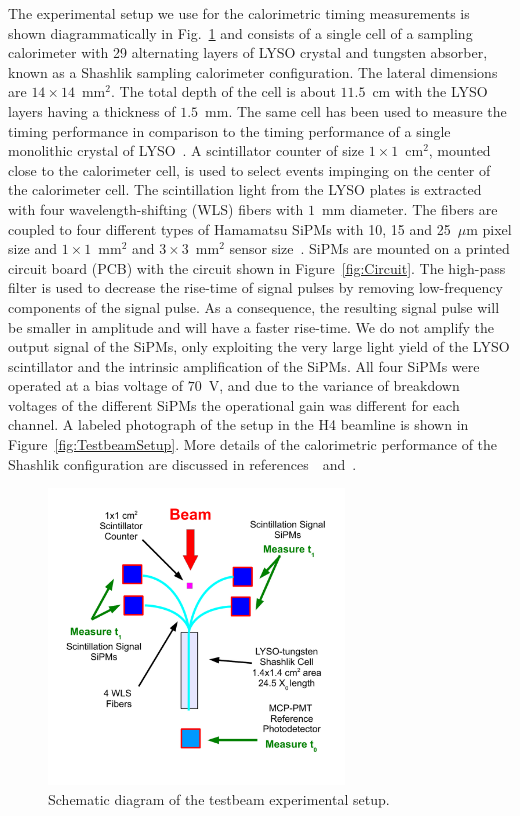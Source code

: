 The experimental setup we use for the calorimetric timing measurements 
is shown diagrammatically in Fig.~\ref{fig:TestbeamSchematic} and consists
of a single cell of a sampling calorimeter with 29 alternating layers of LYSO
crystal and tungsten absorber, known as a Shashlik sampling
calorimeter configuration. The lateral dimensions are
$14\times14$~$\mathrm{mm}^{2}$. The total depth of the cell is about $11.5$~cm
with the LYSO layers having a thickness of $1.5$~mm. The same cell has been used
to measure the timing performance in comparison to the timing performance of a
single monolithic crystal of LYSO~\cite{Anderson:2015gha}. A scintillator
counter of size $1\times 1$~$\mathrm{cm}^{2}$, mounted close to the calorimeter
cell, is used to select events impinging on the center of the calorimeter cell. The
scintillation light from the LYSO plates is extracted with four
wavelength-shifting (WLS) fibers with $1$~mm diameter. The fibers are coupled to four different types
of Hamamatsu SiPMs with 10, 15 and 25~$\mu$m pixel size and $1\times
1$~$\mathrm{mm}^{2}$ and $3\times 3$~$\mathrm{mm}^{2}$ sensor
size~\cite{hamamatsuMPPC}. SiPMs are mounted on a printed circuit board (PCB) with the 
circuit shown in Figure~\ref{fig:Circuit}. The high-pass filter is used to decrease the rise-time of signal 
pulses by removing low-frequency components of the signal pulse. As a consequence, the resulting 
signal pulse will be smaller in amplitude and will have a faster rise-time.
We do not amplify the output signal of the SiPMs, only exploiting the very large
light yield of the LYSO scintillator and the intrinsic amplification of the
SiPMs. All four SiPMs were operated at a bias voltage of $70$~V, and due to the 
variance of breakdown voltages of the different SiPMs the operational gain was 
different for each channel. A labeled photograph of the setup in the H4 beamline is shown in
Figure~\ref{fig:TestbeamSetup}. More details of the calorimetric
performance of the Shashlik configuration are discussed in
references~\cite{shashlik1}~and~\cite{shashlik2}.

\begin{figure}[htbp] 
\centering
\includegraphics[width=0.70\textwidth]{figures/ShashlikFiberSetupSchematic} 
\caption{Schematic diagram of the testbeam experimental setup.} 
\label{fig:TestbeamSchematic} 
\end{figure} 

